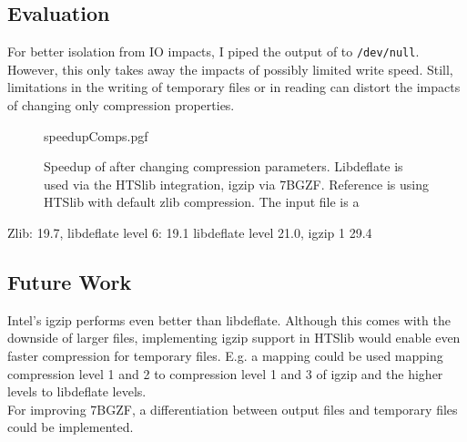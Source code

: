 \subsection{Evaluation}
For better isolation from IO impacts, I piped the output of \sort to \texttt{/dev/null}. However, this only takes away the impacts of possibly limited write speed. Still, limitations in the writing of temporary files or in reading can distort the impacts of changing only compression properties.
\begin{figure}
        {speedupComps.pgf}
    \caption{Speedup of \sort after changing compression parameters. Libdeflate is used via the HTSlib integration, igzip via 7BGZF. Reference is \sort using HTSlib with default zlib compression. The input file is a }
    \label{fig:decomp}
\end{figure}
Zlib: 19.7, libdeflate level 6: 19.1 libdeflate level 21.0, igzip 1 29.4

\subsection{Future Work}
Intel's igzip performs even better than libdeflate. Although this comes with the downside of larger files, implementing igzip support in HTSlib would enable even faster compression for temporary files. E.g. a mapping could be used mapping compression level 1 and 2 to compression level 1 and 3 of igzip and the higher levels to libdeflate levels. \\
For improving 7BGZF, a differentiation between output files and temporary files could be implemented.